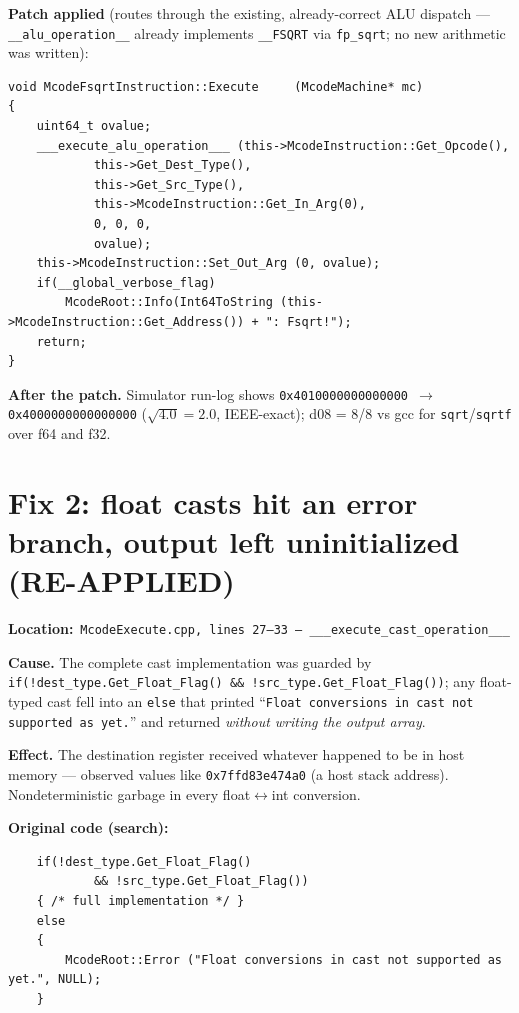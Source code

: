 \documentclass[11pt,a4paper]{report}
\newcommand{\filepath}[1]{\noindent\textbf{Location:}\ \texttt{#1}\par}
\begin{document}
\textbf{Patch applied} (routes through the existing, already-correct ALU
dispatch --- \texttt{\_\_alu\_operation\_\_} already implements
\texttt{\_\_FSQRT} via \texttt{fp\_sqrt}; no new arithmetic was written):
\begin{lstlisting}
void McodeFsqrtInstruction::Execute     (McodeMachine* mc)
{
    uint64_t ovalue;
    ___execute_alu_operation___ (this->McodeInstruction::Get_Opcode(),
            this->Get_Dest_Type(),
            this->Get_Src_Type(),
            this->McodeInstruction::Get_In_Arg(0),
            0, 0, 0,
            ovalue);
    this->McodeInstruction::Set_Out_Arg (0, ovalue);
    if(__global_verbose_flag)
        McodeRoot::Info(Int64ToString (this->McodeInstruction::Get_Address()) + ": Fsqrt!");
    return;
}
\end{lstlisting}

\textbf{After the patch.} Simulator run-log shows
\texttt{0x4010000000000000 $\to$ 0x4000000000000000} ($\sqrt{4.0}=2.0$,
IEEE-exact); d08 = 8/8 vs gcc for \texttt{sqrt}/\texttt{sqrtf} over
f64 and f32.

\section{Fix 2: float casts hit an error branch, output left uninitialized (RE-APPLIED)}

\filepath{McodeExecute.cpp, lines 27--33 --- \_\_\_execute\_cast\_operation\_\_\_}

\textbf{Cause.} The complete cast implementation was guarded by
\texttt{if(!dest\_type.Get\_Float\_Flag() \&\& !src\_type.Get\_Float\_Flag())};
any float-typed cast fell into an \texttt{else} that printed
``\texttt{Float conversions in cast not supported as yet.}'' and returned
\emph{without writing the output array}.

\textbf{Effect.} The destination register received whatever happened to be
in host memory --- observed values like \texttt{0x7ffd83e474a0} (a host
stack address). Nondeterministic garbage in every float$\leftrightarrow$int
conversion.

\textbf{Original code (search):}
\begin{lstlisting}
    if(!dest_type.Get_Float_Flag()
            && !src_type.Get_Float_Flag())
    { /* full implementation */ }
    else
    {
        McodeRoot::Error ("Float conversions in cast not supported as yet.", NULL);
    }
\end{lstlisting}
\end{document}
